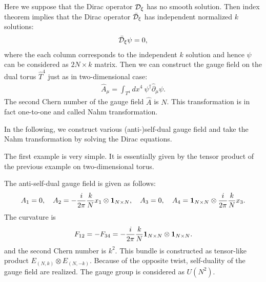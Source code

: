 \documentclass[a4paper,epsf,12pt]{article}
\newcommand{\cD}{{\cal D}}
\newcommand{\unl}{\underline}
\newcommand{\fr}{\frac}
\newcommand{\mn}{{\mu\nu}}
\newcommand{\Ah}{\hat{A}}
\newcommand{\Fh}{\hat{F}}
\newcommand{\Th}{\hat{T}}
\newcommand{\delh}{\hat{\partial}}
\def \cD{{\cal D}}
\def \cDb{{\bar {\cal D}}}
\def \1{{\bf 1}}
\begin{document}
Here we suppose that the Dirac operator $\cD_\xi$ has no smooth
solution.
Then index theorem implies that the Dirac operator $\cDb_\xi$ has independent
normalized $k$ solutions:
\begin{eqnarray}
\label{dirac_04}
\cDb_\xi \psi =0,
\end{eqnarray}
where the each column corresponds to the independent $k$ solution
and hence $\psi$ can be considered as $2N\times k$ matrix.
Then we can construct the gauge field
on the dual torus $\Th^4$ just as in two-dimensional case:
\begin{eqnarray*}
\Ah_\mu=\int_{T^4}dx^4~\psi^\dagger \delh_\mu \psi.
\end{eqnarray*}
The second Chern number of the gauge field $\Ah$ is $N$.
This transformation is in fact one-to-one
and called Nahm transformation.

In the following, we construct various (anti-)self-dual gauge field
and take the Nahm transformation by solving the Dirac equations.

\vspace{2mm}

The first example is very simple. It is essentially given by 
the tensor product of the previous example on two-dimensional torus. 

The anti-self-dual gauge field is given as follows:
\begin{eqnarray}
\label{exmp1}
A_1=0,~~~A_2=-\frac{i}{2\pi}\frac{k}{N}x_1\otimes\1_{N\times N},~~~
A_3=0,~~~A_4=\1_{N\times N}\otimes\frac{i}{2\pi}\frac{k}{N}x_3.
\end{eqnarray}
The curvature is
\begin{eqnarray*}
F_{12}=-F_{34}=-\fr{i}{2\pi}\fr{k}{N}\1_{N\times N}\otimes\1_{N\times N}.
\end{eqnarray*}
and the second Chern number is $k^2$.
This bundle is constructed as 
tensor-like product $E_{(N,k)}\otimes E_{(N,-k)}$.
Because of the opposite twist, 
self-duality of the gauge field are realized.
The gauge group is considered as $U(N^2)$.
\end{document}
